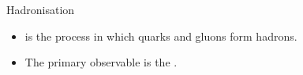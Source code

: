 \begin{frame}{Hadronisation}
    \label{10.13::hadronisation}

    \vspace{12pt}

    \begin{itemize}
        \item
             is the process in which quarks and gluons form hadrons.


        \vspace{12pt}
        \item
            The primary observable is the .
    \end{itemize}

    \vspace{-12pt}

    \begin{center}
        \begin{figure}[t]
        \end{figure}
    \end{center}

\end{frame}

